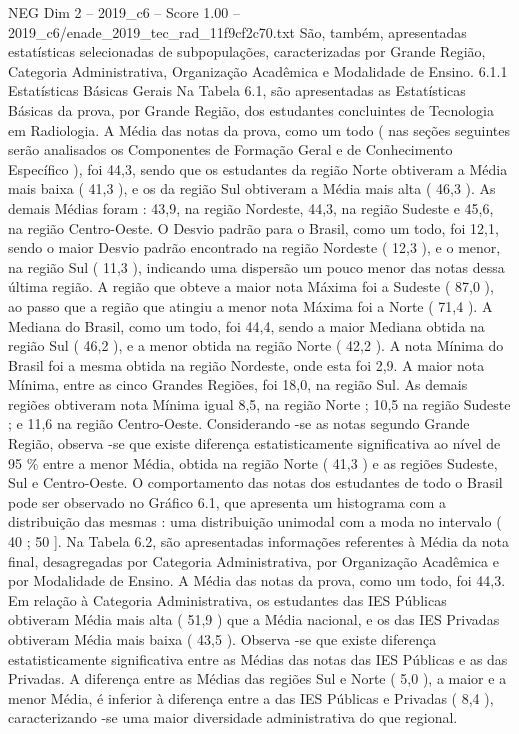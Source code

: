 \begin{textsample}{NEG Dim 2 – 2019\_c6 – Score 1.00 – 2019\_c6/enade\_2019\_tec\_rad\_11f9cf2c70.txt}
São, também, apresentadas estatísticas selecionadas de subpopulações, caracterizadas por Grande Região, Categoria Administrativa, Organização Acadêmica e Modalidade de Ensino. 6.1.1 Estatísticas Básicas Gerais Na Tabela 6.1, são apresentadas as Estatísticas Básicas da prova, por Grande Região, dos estudantes concluintes de Tecnologia em Radiologia.
A Média das notas da prova, como um todo ( nas seções seguintes serão analisados os Componentes de Formação Geral e de Conhecimento Específico ), foi 44,3, sendo que os estudantes da região Norte obtiveram a Média mais baixa ( 41,3 ), e os da região Sul obtiveram a Média mais alta ( 46,3 ).
As demais Médias foram : 43,9, na região Nordeste, 44,3, na região Sudeste e 45,6, na região Centro-Oeste.
O Desvio padrão para o Brasil, como um todo, foi 12,1, sendo o maior Desvio padrão encontrado na região Nordeste ( 12,3 ), e o menor, na região Sul ( 11,3 ), indicando uma dispersão um pouco menor das notas dessa última região.
A região que obteve a maior nota Máxima foi a Sudeste ( 87,0 ), ao passo que a região que atingiu a menor nota Máxima foi a Norte ( 71,4 ).
A Mediana do Brasil, como um todo, foi 44,4, sendo a maior Mediana obtida na região Sul ( 46,2 ), e a menor obtida na região Norte ( 42,2 ).
A nota Mínima do Brasil foi a mesma obtida na região Nordeste, onde esta foi 2,9.
A maior nota Mínima, entre as cinco Grandes Regiões, foi 18,0, na região Sul.
As demais regiões obtiveram nota Mínima igual 8,5, na região Norte ; 10,5 na região Sudeste ; e 11,6 na região Centro-Oeste.
Considerando -se as notas segundo Grande Região, observa -se que existe diferença estatisticamente significativa ao nível de 95 \% entre a menor Média, obtida na região Norte ( 41,3 ) e as regiões Sudeste, Sul e Centro-Oeste.
O comportamento das notas dos estudantes de todo o Brasil pode ser observado no Gráfico 6.1, que apresenta um histograma com a distribuição das mesmas : uma distribuição unimodal com a moda no intervalo ( 40 ; 50 ].
Na Tabela 6.2, são apresentadas informações referentes à Média da nota final, desagregadas por Categoria Administrativa, por Organização Acadêmica e por Modalidade de Ensino.
A Média das notas da prova, como um todo, foi 44,3.
Em relação à Categoria Administrativa, os estudantes das IES Públicas obtiveram Média mais alta ( 51,9 ) que a Média nacional, e os das IES Privadas obtiveram Média mais baixa ( 43,5 ).
Observa -se que existe diferença estatisticamente significativa entre as Médias das notas das IES Públicas e as das Privadas.
A diferença entre as Médias das regiões Sul e Norte ( 5,0 ), a maior e a menor Média, é inferior à diferença entre a das IES Públicas e Privadas ( 8,4 ), caracterizando -se uma maior diversidade administrativa do que regional.

\end{textsample}
